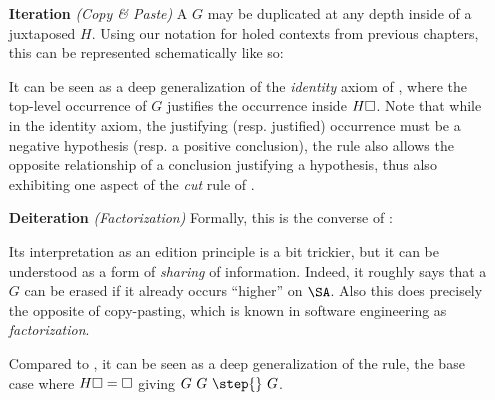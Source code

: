 \begin{itemize}
  \item[\textbf{Iteration} \textit{(Copy \& Paste)}]
    A  $G$ may be duplicated at any depth inside of a juxtaposed  $H$.
    Using our notation for holed contexts from previous chapters, this can be
    represented schematically like so:
    It can be seen as a deep generalization of the \emph{identity} axiom of
    , where the top-level occurrence of $G$ justifies the
    occurrence inside $H\square$. Note that while in the identity axiom, the justifying
    (resp. justified) occurrence must be a negative hypothesis (resp. a positive
    conclusion), the  rule also allows the opposite relationship
    of a conclusion justifying a hypothesis, thus also exhibiting one aspect of
    the \emph{cut} rule of .
  \item[\textbf{Deiteration} \textit{(Factorization)}]
    Formally, this is the converse of :
    Its interpretation as an edition principle is a bit trickier, but it can be
    understood as a form of \emph{sharing} of information. Indeed, it roughly
    says that a  $G$ can be erased if it already occurs ``higher'' on
    $\SA$. Also this does precisely the opposite of copy-pasting, which is known
    in software engineering as \emph{factorization}.
    
    Compared to , it can be seen as a deep generalization of the
    \emph{} rule, the base case where $H\square = \square$ giving $G~G
    ~\step{}~ G$.
\end{itemize}

